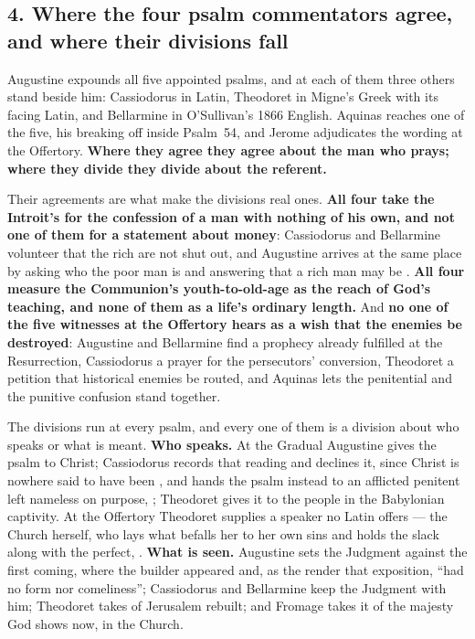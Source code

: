 \subsection*{4. Where the four psalm commentators agree, and where their divisions fall}

Augustine expounds all five appointed psalms, and at each of them three others
stand beside him: Cassiodorus in Latin, Theodoret in Migne's Greek with its
facing Latin, and Bellarmine in O'Sullivan's 1866 English. Aquinas reaches one of
the five, his  breaking off inside Psalm~54, and
Jerome adjudicates the wording at the Offertory. \textbf{Where
they agree they agree about the man who prays; where they divide they divide
about the referent.}

Their agreements are what make the divisions real ones. \textbf{All four take the Introit's  for the
confession of a man with nothing of his own, and not one of them for a statement
about money}: Cassiodorus and Bellarmine volunteer that the rich are not shut
out, and Augustine arrives at the same place by asking who the poor man is and
answering that a rich man may be . \textbf{All four
measure the Communion's youth-to-old-age as the reach of God's teaching, and none
of them as a life's ordinary length.} And \textbf{no one of the five witnesses at
the Offertory hears  as a wish that the
enemies be destroyed}: Augustine and Bellarmine find a prophecy already fulfilled
at the Resurrection, Cassiodorus a prayer for the persecutors' conversion,
Theodoret a petition that historical enemies be routed, and Aquinas lets the
penitential and the punitive confusion stand together.

The divisions run at every psalm, and every one of them is a division about who
speaks or what is meant. \textbf{Who speaks.} At the Gradual Augustine gives the
psalm to Christ; Cassiodorus records that reading and declines it, since Christ
is nowhere said to have been , and hands the psalm instead to an
afflicted penitent left nameless on purpose, ; Theodoret gives it to the people in
the Babylonian captivity. At the Offertory Theodoret supplies a speaker no Latin
offers --- the Church herself, who lays what befalls her to her own sins and
holds the slack along with the perfect, . \textbf{What is seen.} Augustine sets the Judgment against the
first coming, where the builder appeared  and, as the
 render that exposition, ``had no form nor
comeliness''; Cassiodorus and Bellarmine keep the Judgment with him;
Theodoret takes  of Jerusalem rebuilt; and Fromage takes it of
the majesty God shows now, in the Church.

